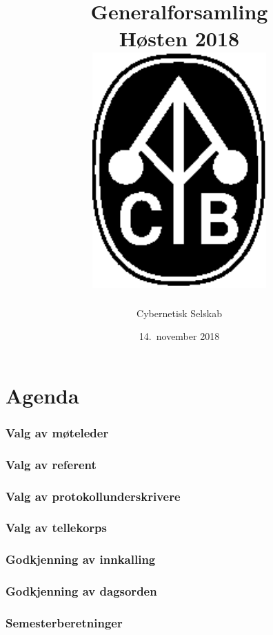 \documentclass[10pt,norsk,a4paper]{article}
\title{Generalforsamling \\
	Høsten 2018\\[3cm]
	\includegraphics[width=0.5\textwidth]{cyb-logo.eps}\\[-.5cm]}
\date{14.\ november 2018}
\author{Cybernetisk Selskab}
\begin{document}
\maketitle{}
\newpage
\tableofcontents

\part*{Agenda}

\section{Valg av møteleder}

\section{Valg av referent}

\section{Valg av protokollunderskrivere}

\section{Valg av tellekorps}

\section{Godkjenning av innkalling}

\section{Godkjenning av dagsorden}

\section{Semesterberetninger}
\end{document}
